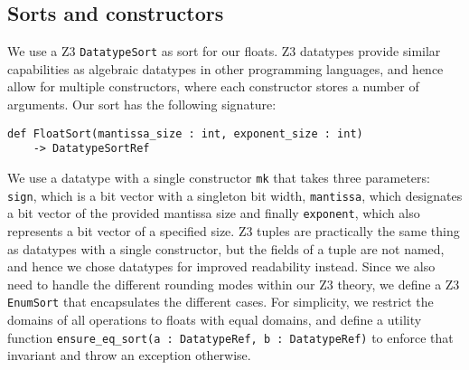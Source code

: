 \documentclass[a4paper,UKenglish,cleveref, autoref, thm-restate]{lipics-v2019}
\begin{document}
\subsection{Sorts and constructors}
We use a Z3 \verb|DatatypeSort| as sort for our floats. Z3 datatypes provide similar capabilities as algebraic datatypes in other programming languages, and hence allow for multiple constructors, where each constructor stores a number of arguments. Our sort has the following signature:
\begin{lstlisting}
def FloatSort(mantissa_size : int, exponent_size : int) 
    -> DatatypeSortRef
\end{lstlisting}
We use a datatype with a single constructor \verb|mk| that takes three parameters: \verb|sign|, which is a bit vector with a singleton bit width, \verb|mantissa|, which designates a bit vector of the provided mantissa size and finally \verb|exponent|, which also represents a bit vector of a specified size. Z3 tuples are practically the same thing as datatypes with a single constructor, but the fields of a tuple are not named, and hence we chose datatypes for improved readability instead.
Since we also need to handle the different rounding modes within our Z3 theory, we define a Z3 \verb|EnumSort| that encapsulates the different cases.
For simplicity, we restrict the domains of all operations to floats with equal domains, and define a utility function \verb|ensure_eq_sort(a : DatatypeRef, b : DatatypeRef)| to enforce that invariant and throw an exception otherwise.
\end{document}

